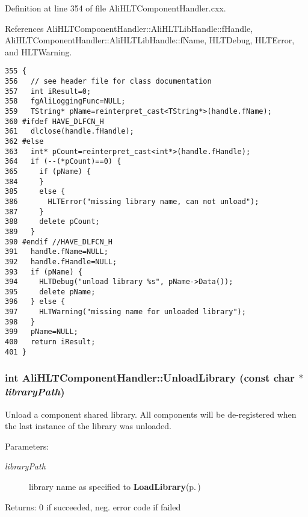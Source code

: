 Definition at line 354 of file Ali\-HLTComponent\-Handler.cxx.

References Ali\-HLTComponent\-Handler::Ali\-HLTLib\-Handle::f\-Handle, Ali\-HLTComponent\-Handler::Ali\-HLTLib\-Handle::f\-Name, HLTDebug, HLTError, and HLTWarning.

\footnotesize\begin{verbatim}355 {
356   // see header file for class documentation
357   int iResult=0;
358   fgAliLoggingFunc=NULL;
359   TString* pName=reinterpret_cast<TString*>(handle.fName);
360 #ifdef HAVE_DLFCN_H
361   dlclose(handle.fHandle);
362 #else
363   int* pCount=reinterpret_cast<int*>(handle.fHandle);
364   if (--(*pCount)==0) {
365     if (pName) {
384     }
385     else {
386       HLTError("missing library name, can not unload");
387     }
388     delete pCount;
389   }
390 #endif //HAVE_DLFCN_H
391   handle.fName=NULL;
392   handle.fHandle=NULL;
393   if (pName) {
394     HLTDebug("unload library %s", pName->Data());
395     delete pName;
396   } else {
397     HLTWarning("missing name for unloaded library");
398   }
399   pName=NULL;
400   return iResult;
401 }
\end{verbatim}\normalsize 


\subsubsection{\setlength{\rightskip}{0pt plus 5cm}int Ali\-HLTComponent\-Handler::Unload\-Library (const char $\ast$ {\em library\-Path})}\label{classAliHLTComponentHandler_a8}


Unload a component shared library. All components will be de-registered when the last instance of the library was unloaded. \begin{Desc}
\item[Parameters:]
\begin{description}
\item[{\em library\-Path}]library name as specified to {\bf Load\-Library}{\rm (p.\,\pageref{classAliHLTComponentHandler_a6})} \end{description}
\end{Desc}
\begin{Desc}
\item[Returns:]0 if succeeded, neg. error code if failed \end{Desc}


